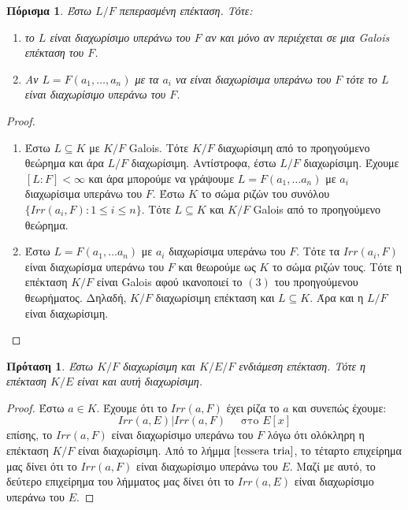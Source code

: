 \documentclass[oneside,a4paper]{article}
\newtheorem{prop}{Πρόταση}
\newtheorem{cor}{Πόρισμα}
\newcommand {\tl}{\textlatin}
\begin{document}
\vspace{0.1cm}
\begin{cor} Έστω $L/F$ πεπερασμένη επέκταση. Τότε:
	\begin{enumerate}
		\item το $L$ είναι διαχωρίσιμο υπεράνω του $F$ αν και μόνο αν περιέχεται σε μια \tl{Galois} επέκταση του $F$.
		\item Αν $L = F(a_1, \ldots , a_n)$ με τα $a_i$ να είναι διαχωρίσιμα υπεράνω του $F$ τότε το $L$ είναι διαχωρίσιμο υπεράνω του $F$.
	\end{enumerate}
\end{cor}
\begin{proof} $ $
	
	\begin{enumerate}
	
	\item Έστω $L\subseteq K$ με $K/F$ \tl{Galois}. Τότε $K/F$ διαχωρίσιμη από το προηγούμενο θεώρημα και άρα $L/F$ διαχωρίσιμη.
	Αντίστροφα, έστω $L/F$ διαχωρίσιμη. Έχουμε $[L:F] <\infty$ και άρα μπορούμε να γράψουμε $L = F(a_1,\ldots a_n)$ με $a_i$ διαχωρίσιμα υπεράνω του $F$. Έστω $K$ το σώμα ριζών του συνόλου $\{Irr(a_i,F): 1\leq i\leq n\}$. Τότε $L\subseteq K$ και $K/F$ \tl{Galois} από το προηγούμενο θεώρημα.

	\item Έστω $L = F(a_1, \ldots a_n)$ με $a_i$ διαχωρίσιμα υπεράνω του $F$. Τότε τα $Irr(a_i,F)$ είναι διαχωρίσμα υπεράνω του $F$ και θεωρούμε ως $K$ το σώμα ριζών τους. Τότε η επέκταση $K/F$ είναι \tl{Galois} αφού ικανοποιεί το $(3)$ του προηγούμενου θεωρήματος. Δηλαδή, $K/F$ διαχωρίσιμη επέκταση και $L\subseteq K$. Άρα και η $L/F$ είναι διαχωρίσιμη.
	\end{enumerate}
\end{proof}

\vspace{0.1cm}
\begin{prop}
	\label{myprop}
	Έστω $K/F$ διαχωρίσιμη και $K/E/F$ ενδιάμεση επέκταση. Τότε η επέκταση $K/E$ είναι και αυτή διαχωρίσιμη.
\end{prop}
\begin{proof}
	Έστω $a \in K$. Έχουμε ότι το $Irr(a,F)$ έχει ρίζα το $a$ και συνεπώς έχουμε:
	$$Irr(a,E) | Irr(a,F) \quad \text{ στο } E[x]$$
	επίσης, το $Irr(a,F)$ είναι διαχωρίσιμο υπεράνω του $F$ λόγω ότι ολόκληρη η επέκταση $K/F$ είναι διαχωρίσιμη. Από το λήμμα $\ref{tessera tria}$, το τέταρτο επιχείρημα μας δίνει ότι το $Irr(a,F)$ είναι διαχωρίσιμο υπεράνω του $E$. Μαζί με αυτό, το δεύτερο επιχείρημα του λήμματος μας δίνει ότι το $Irr(a,E)$ είναι διαχωρίσιμο υπεράνω του $E$.
\end{proof}
\end{document}
